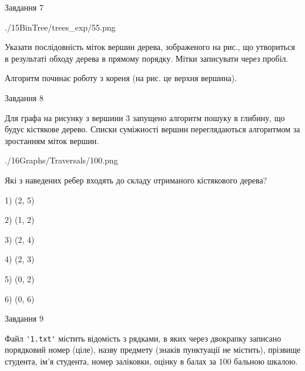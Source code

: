 \documentclass[12pt, ukrainian]{article}
\def\code#1{\Verb!#1!}
\begin{document}
{\vspace{10mm}\par

\newpage
\begin{minipage}[t]{9.7cm}
               
{\begin{center}Завдання {7}\end{center}}
\vspace{-6mm}

\begin{center}
	{./15BinTree/trees_exp/55.png}
\end{center}
Указати послідовність міток вершин дерева, зображеного на рис., що утвориться в результаті обходу дерева в прямому порядку. Мітки записувати через пробіл.\par Алгоритм починає роботу з кореня (на рис. це верхня вершина).\par

\end{minipage}
\vline \hspace{8mm}
\begin{minipage}[t]{8.0cm}
               
{\begin{center}Завдання {8}\end{center}}
\vspace{-6mm}
Для графа на рисунку з вершини 3 запущено алгоритм пошуку в глибину, що будує кістякове дерево. Списки суміжності вершин переглядаються алгоритмом за зростанням міток вершин.\par
\begin{center}
	{./16Graphs/Traversals/100.png}
\end{center}
\par Які з наведених ребер входять до складу отриманого кістякового дерева?\par
1) (2, 5)\par
2) (1, 2)\par
3) (2, 4)\par
4) (2, 3)\par
5) (0, 2)\par
6) (0, 6)\par
{\vskip 15pt} \par

\end{minipage}

               
{\begin{center}Завдання {9}\end{center}}
\vspace{-6mm}
Файл \code{'1.txt'} містить відомість з рядками, в яких через двокрапку записано поряд\-ковий номер (ціле), назву предмету (знаків пунктуації не містить), прізвище студента, ім'я студента, номер заліковки, оцінку в балах за 100 бальною шкалою.

}
\end{document}
